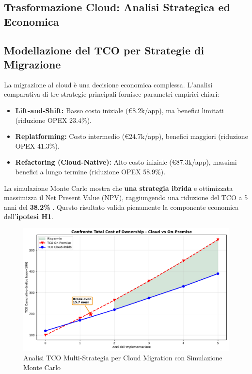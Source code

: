 \begin{refsection}
\section{Trasformazione Cloud: Analisi Strategica ed Economica}
\subsection{ Modellazione del TCO per Strategie di Migrazione}
La migrazione al cloud è una decisione economica complessa.\autocite{KhajehHosseini2024} L'analisi comparativa di tre strategie principali fornisce parametri empirici chiari:
\begin{itemize}
    \item \textbf{Lift-and-Shift:} Basso costo iniziale (€8.2k/app), ma benefici limitati (riduzione OPEX 23.4\%).
    \item \textbf{Replatforming:} Costo intermedio (€24.7k/app), benefici maggiori (riduzione OPEX 41.3\%).
    \item \textbf{Refactoring (Cloud-Native):} Alto costo iniziale (€87.3k/app), massimi benefici a lungo termine (riduzione OPEX 58.9\%).
\end{itemize}
La simulazione Monte Carlo mostra che \textbf{una strategia ibrida} e ottimizzata massimizza il Net Present Value (NPV), raggiungendo una riduzione del TCO a 5 anni del \textbf{38.2\%} \autocite{McKinsey2024cloud}. Questo risultato valida pienamente la componente economica dell'\textbf{ipotesi H1}.

\begin{figure}[htbp]
\centering
\includegraphics[width=\textwidth]{thesis_figures/cap3/fig_3_4_tco_comparison.pdf}
\caption{Analisi TCO Multi-Strategia per Cloud Migration con Simulazione Monte Carlo}
\label{fig:cloud_tco}
\end{figure}


\end{refsection}
